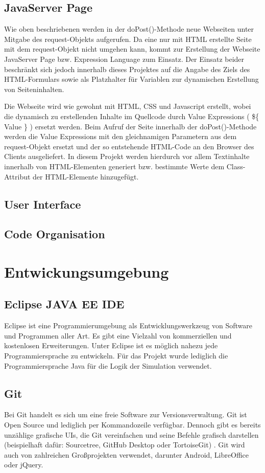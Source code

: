 \section{JavaServer Page}
Wie oben beschriebenen werden in der doPost()-Methode neue Webseiten unter Mitgabe des request-Objekts aufgerufen. Da eine nur mit HTML erstellte Seite mit dem request-Objekt nicht umgehen kann, kommt zur Erstellung der Webseite JavaServer Page bzw. Expression Language zum Einsatz. Der Einsatz beider beschränkt sich jedoch innerhalb dieses Projektes auf die Angabe des Ziels des HTML-Formulars sowie als Platzhalter für Variablen zur dynamischen Erstellung von Seiteninhalten.

Die Webseite wird wie gewohnt mit HTML, CSS und Javascript erstellt, wobei die dynamisch zu erstellenden Inhalte im Quellcode durch Value Expressions ( \$\{ Value \} ) ersetzt werden. Beim Aufruf der Seite innerhalb der doPost()-Methode werden die Value Expressions mit den gleichnamigen Parametern aus dem request-Objekt ersetzt und der so entstehende HTML-Code an den Browser des Clients ausgeliefert. In diesem Projekt werden hierdurch vor allem Textinhalte innerhalb von HTML-Elementen generiert bzw. bestimmte Werte dem Class-Attribut der HTML-Elemente hinzugefügt.

\section{User Interface}
\section{Code Organisation}

\clearpage
\chapter{Entwickungsumgebung}
\section{Eclipse JAVA EE IDE}
Eclipse ist eine Programmierumgebung als Entwicklungswerkzeug von Software und Programmen aller Art. Es gibt eine Vielzahl von kommerziellen und kostenlosen Erweiterungen. Unter Eclipse ist es möglich nahezu jede Programmiersprache zu entwickeln. Für das Projekt wurde lediglich die Programmiersprache Java für die Logik der Simulation verwendet.
\section{Git}
Bei Git handelt es sich um eine freie Software zur Versionsverwaltung. Git ist Open Source und lediglich per Kommandozeile verfügbar. Dennoch gibt es bereits unzählige grafische UIs, die Git vereinfachen und seine Befehle grafisch darstellen (beispielhaft dafür: Sourcetree, GitHub Desktop oder TortoiseGit) . Git wird auch von zahlreichen Großprojekten verwendet, darunter Android, LibreOffice oder jQuery.
